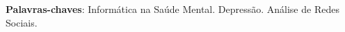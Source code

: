 
\setlength{\absparsep}{18pt} %
\begin{resumo}

 \textbf{Palavras-chaves}: Informática na Saúde Mental. Depressão. Análise de Redes Sociais. 
\end{resumo}

